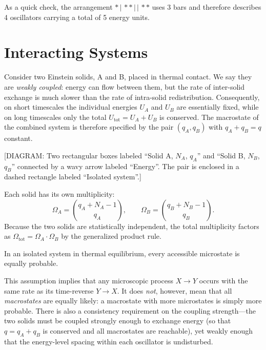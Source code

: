 As a quick check, the arrangement $*\,|\,{*}{*}\,|\,|\,{*}{*}$ uses 3 bars and therefore
describes 4 oscillators carrying a total of 5 energy units.

\section{Interacting Systems}
\label{sec:interacting}

Consider two Einstein solids, A and B, placed in thermal contact.  We say they are
\emph{weakly coupled}: energy can flow between them, but the rate of inter-solid exchange
is much slower than the rate of intra-solid redistribution.  Consequently, on short
timescales the individual energies $U_A$ and $U_B$ are essentially fixed, while on long
timescales only the total $U_{\text{tot}} = U_A + U_B$ is conserved.  The macrostate of
the combined system is therefore specified by the pair $(q_A, q_B)$ with $q_A + q_B = q$
constant.

\begin{center}
[DIAGRAM: Two rectangular boxes labeled ``Solid A, $N_A$, $q_A$'' and
``Solid B, $N_B$, $q_B$'' connected by a wavy arrow labeled ``Energy''.  The pair is
enclosed in a dashed rectangle labeled ``Isolated system''.]
\end{center}

Each solid has its own multiplicity:
\[
  \Omega_A = \binom{q_A + N_A - 1}{q_A}, \qquad
  \Omega_B = \binom{q_B + N_B - 1}{q_B}.
\]
Because the two solids are statistically independent, the total multiplicity factors as
$\Omega_{\text{tot}} = \Omega_A \cdot \Omega_B$ by the generalized product rule.

\begin{definition}
In an isolated system in thermal equilibrium, every accessible microstate is equally
probable.
\end{definition}

This assumption implies that any microscopic process $X \to Y$ occurs with the same rate
as its time-reverse $Y \to X$.  It does \emph{not}, however, mean that all
\emph{macrostates} are equally likely: a macrostate with more microstates is simply more
probable.  There is also a consistency requirement on the coupling strength---the two
solids must be coupled strongly enough to exchange energy (so that $q = q_A + q_B$ is
conserved and all macrostates are reachable), yet weakly enough that the energy-level
spacing within each oscillator is undisturbed.

